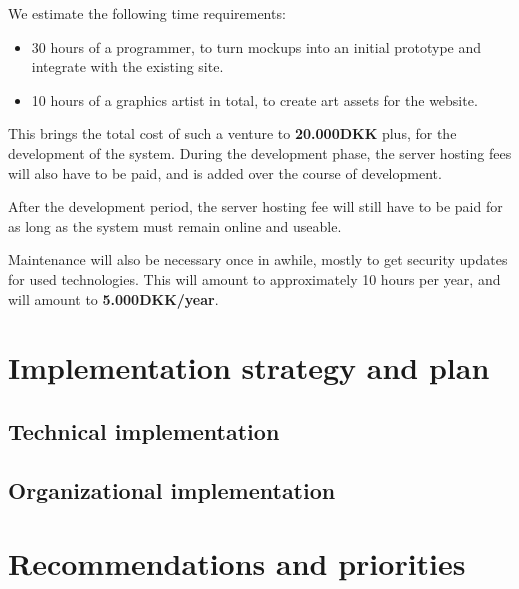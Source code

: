We estimate the following time requirements:

\begin{itemize}
	\item 30 hours of a programmer, to turn mockups into an initial prototype and integrate with the existing site.
	\item 10 hours of a graphics artist in total, to create art assets for the website.
\end{itemize}

This brings the total cost of such a venture to \textbf{20.000DKK} plus, for the 
development of the system. During the development phase, the server hosting
fees will also have to be paid, and is added over the course of development.

After the development period, the server hosting fee will still have to be paid
for as long as the system must remain online and useable. 

Maintenance will also be necessary once in awhile, mostly to get security 
updates for used technologies. This will amount to approximately 10 hours per year, 
and will amount to \textbf{5.000DKK/year}.


\section{Implementation strategy and plan}
\subsection{Technical implementation}
\subsection{Organizational implementation}

\section{Recommendations and priorities}

\newpage
